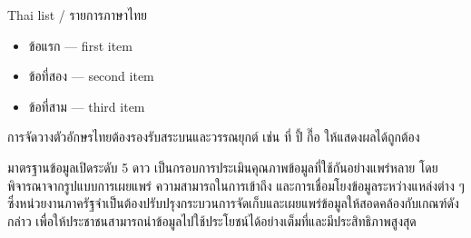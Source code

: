 \begin{frame}{Thai list / รายการภาษาไทย}
  \begin{itemize}
    \item ข้อแรก --- first item
    \item ข้อที่สอง --- second item
    \item ข้อที่สาม --- third item
  \end{itemize}

  \vspace{0.3em}
  การจัดวางตัวอักษรไทยต้องรองรับสระบนและวรรณยุกต์ เช่น ที่ ปี้ กื๊อ ให้แสดงผลได้ถูกต้อง

  \vspace{0.3em}
  มาตรฐานข้อมูลเปิดระดับ 5 ดาว เป็นกรอบการประเมินคุณภาพข้อมูลที่ใช้กันอย่างแพร่หลาย
  โดยพิจารณาจากรูปแบบการเผยแพร่ ความสามารถในการเข้าถึง
  และการเชื่อมโยงข้อมูลระหว่างแหล่งต่าง ๆ
  ซึ่งหน่วยงานภาครัฐจำเป็นต้องปรับปรุงกระบวนการจัดเก็บและเผยแพร่ข้อมูลให้สอดคล้องกับเกณฑ์ดังกล่าว
  เพื่อให้ประชาชนสามารถนำข้อมูลไปใช้ประโยชน์ได้อย่างเต็มที่และมีประสิทธิภาพสูงสุด
\end{frame}
